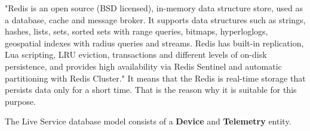 "Redis is an open source (BSD licensed), in-memory data structure store, used as a database, cache and message broker.
It supports data structures such as strings, hashes, lists, sets, sorted sets with range queries, bitmaps, hyperloglogs, geospatial indexes with radius queries and streams.
Redis has built-in replication, Lua scripting, LRU eviction, transactions and different levels of on-disk persistence, and provides high availability via Redis Sentinel and automatic partitioning with Redis Cluster."\cite{redis}
It means that the Redis is real-time storage that persists data only for a short time.
That is the reason why it is suitable for this purpose.

The Live Service database model consists of a \textbf{Device} and \textbf{Telemetry} entity.

